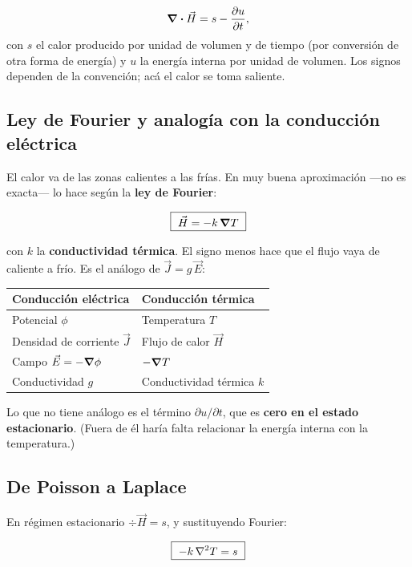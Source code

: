 \documentclass[12pt,a4paper]{article}
\begin{document}
\[
\div \vec H = s - \pdv{u}{t},
\]
con $s$ el calor producido por unidad de volumen y de tiempo (por conversión de
otra forma de energía) y $u$ la energía interna por unidad de volumen. Los
signos dependen de la convención; acá el calor se toma saliente.

\subsection{Ley de Fourier y analogía con la conducción eléctrica}

El calor va de las zonas calientes a las frías. En muy buena aproximación ---no
es exacta--- lo hace según la \textbf{ley de Fourier}:

\begin{keybox}
\[
\boxed{\ \vec H = -k\,\vnabla T\ }
\]
\end{keybox}
con $k$ la \textbf{conductividad térmica}. El signo menos hace que el flujo vaya de
caliente a frío. Es el análogo de $\vec J = g\,\vec E$:

\begin{center}
\renewcommand{\arraystretch}{1.35}
\small
\begin{tabularx}{\textwidth}{>{\raggedright\arraybackslash}X>{\raggedright\arraybackslash}X}
\toprule
\textbf{Conducción eléctrica} & \textbf{Conducción térmica} \\
\midrule
Potencial $\phi$ & Temperatura $T$ \\
Densidad de corriente $\vec J$ & Flujo de calor $\vec H$ \\
Campo $\vec E = -\vnabla\phi$ & $-\vnabla T$ \\
Conductividad $g$ & Conductividad térmica $k$ \\
\bottomrule
\end{tabularx}
\end{center}

Lo que no tiene análogo es el término $\partial u/\partial t$, que es \textbf{cero en
el estado estacionario}. (Fuera de él haría falta relacionar la energía
interna con la temperatura.)

\subsection{De Poisson a Laplace}

En régimen estacionario $\div \vec H = s$, y sustituyendo Fourier:

\begin{keybox}
\[
\boxed{\ -k\,\laplacian  T = s\ }
\]
\end{keybox}
\end{document}
